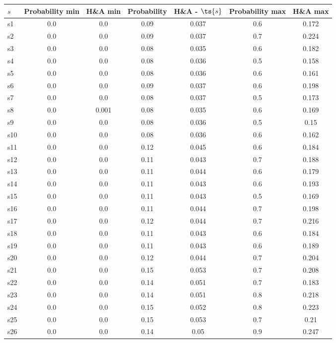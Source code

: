 \documentclass{article}
\begin{document}
\noindent\begin{tabular}{|l|c|c|c|c|c|c|}
\hline
$s$& Probability min & H\&A min & Probability & H\&A - $\ts{s}$ & Probability max & H\&A max\\
\hline
s1 &0.0 & 0.0 & 0.09 & 0.037 & 0.6 & 0.172\\
\hline
s2 &0.0 & 0.0 & 0.09 & 0.037 & 0.7 & 0.224\\
\hline
s3 &0.0 & 0.0 & 0.08 & 0.035 & 0.6 & 0.182\\
\hline
s4 &0.0 & 0.0 & 0.08 & 0.036 & 0.5 & 0.158\\
\hline
s5 &0.0 & 0.0 & 0.08 & 0.036 & 0.6 & 0.161\\
\hline
s6 &0.0 & 0.0 & 0.09 & 0.037 & 0.6 & 0.198\\
\hline
s7 &0.0 & 0.0 & 0.08 & 0.037 & 0.5 & 0.173\\
\hline
s8 &0.0 & 0.001 & 0.08 & 0.035 & 0.6 & 0.169\\
\hline
s9 &0.0 & 0.0 & 0.08 & 0.036 & 0.5 & 0.15\\
\hline
s10 &0.0 & 0.0 & 0.08 & 0.036 & 0.6 & 0.162\\
\hline
s11 &0.0 & 0.0 & 0.12 & 0.045 & 0.6 & 0.184\\
\hline
s12 &0.0 & 0.0 & 0.11 & 0.043 & 0.7 & 0.188\\
\hline
s13 &0.0 & 0.0 & 0.11 & 0.044 & 0.6 & 0.179\\
\hline
s14 &0.0 & 0.0 & 0.11 & 0.043 & 0.6 & 0.193\\
\hline
s15 &0.0 & 0.0 & 0.11 & 0.043 & 0.5 & 0.169\\
\hline
s16 &0.0 & 0.0 & 0.11 & 0.044 & 0.7 & 0.198\\
\hline
s17 &0.0 & 0.0 & 0.12 & 0.044 & 0.7 & 0.216\\
\hline
s18 &0.0 & 0.0 & 0.11 & 0.043 & 0.6 & 0.184\\
\hline
s19 &0.0 & 0.0 & 0.11 & 0.043 & 0.6 & 0.189\\
\hline
s20 &0.0 & 0.0 & 0.12 & 0.044 & 0.7 & 0.204\\
\hline
s21 &0.0 & 0.0 & 0.15 & 0.053 & 0.7 & 0.208\\
\hline
s22 &0.0 & 0.0 & 0.14 & 0.051 & 0.7 & 0.183\\
\hline
s23 &0.0 & 0.0 & 0.14 & 0.051 & 0.8 & 0.218\\
\hline
s24 &0.0 & 0.0 & 0.15 & 0.052 & 0.8 & 0.223\\
\hline
s25 &0.0 & 0.0 & 0.15 & 0.053 & 0.7 & 0.21\\
\hline
s26 &0.0 & 0.0 & 0.14 & 0.05 & 0.9 & 0.247\\

\end{tabular}
\end{document}
